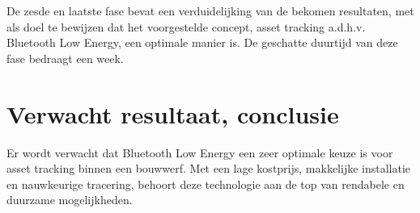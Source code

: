 De zesde en laatste fase bevat een verduidelijking van de bekomen resultaten, met als doel te bewijzen dat het voorgestelde concept, asset tracking a.d.h.v. Bluetooth Low Energy, een optimale manier is. De geschatte duurtijd van deze fase bedraagt een week.


%
%
%
%
%

\section{Verwacht resultaat, conclusie}%
\label{sec:verwachte_resultaten}

Er wordt verwacht dat Bluetooth Low Energy een zeer optimale keuze is voor asset tracking binnen een bouwwerf. Met een lage kostprijs, makkelijke installatie en nauwkeurige tracering, behoort deze technologie aan de top van rendabele en duurzame mogelijkheden.

